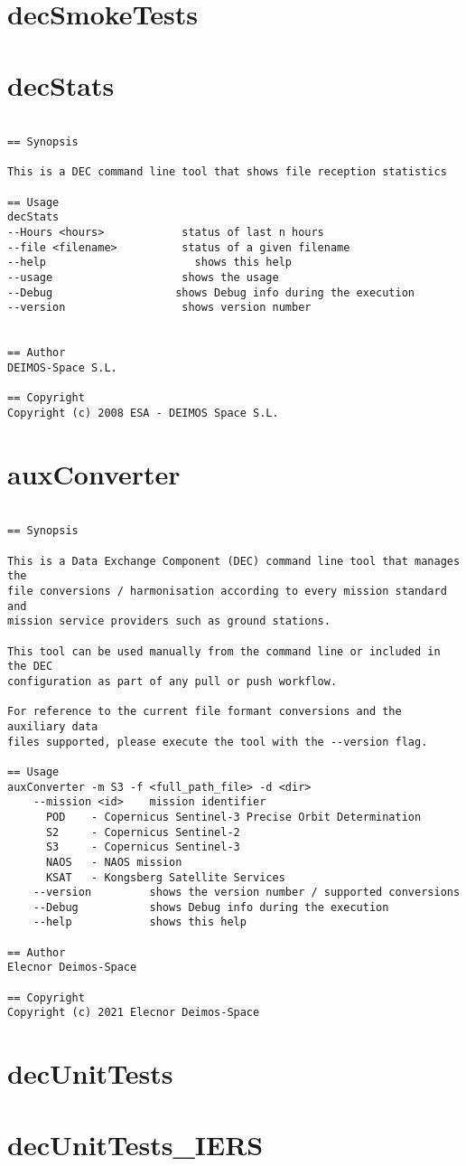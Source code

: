 \documentclass[dec_sum_main.tex]{subfiles}
\begin{document}
\section{decSmokeTests}

\label{decStats}
\section{decStats}

\begin{verbatim}

== Synopsis

This is a DEC command line tool that shows file reception statistics  

== Usage
decStats
--Hours <hours>            status of last n hours
--file <filename>          status of a given filename
--help                     	 shows this help
--usage                    shows the usage
--Debug                   shows Debug info during the execution
--version                  shows version number


== Author
DEIMOS-Space S.L.

== Copyright
Copyright (c) 2008 ESA - DEIMOS Space S.L.

\end{verbatim}

\label{auxConverter}
\section{auxConverter}

\begin{verbatim}

== Synopsis

This is a Data Exchange Component (DEC) command line tool that manages the
file conversions / harmonisation according to every mission standard and 
mission service providers such as ground stations.

This tool can be used manually from the command line or included in the DEC
configuration as part of any pull or push workflow.

For reference to the current file formant conversions and the auxiliary data
files supported, please execute the tool with the --version flag.

== Usage
auxConverter -m S3 -f <full_path_file> -d <dir>
    --mission <id>    mission identifier
      POD    - Copernicus Sentinel-3 Precise Orbit Determination
      S2     - Copernicus Sentinel-2
      S3     - Copernicus Sentinel-3
      NAOS   - NAOS mission
      KSAT   - Kongsberg Satellite Services
    --version         shows the version number / supported conversions
    --Debug           shows Debug info during the execution
    --help            shows this help

== Author
Elecnor Deimos-Space

== Copyright
Copyright (c) 2021 Elecnor Deimos-Space

\end{verbatim}


\section{decUnitTests}

\section{decUnitTests\_IERS}
\end{document}
